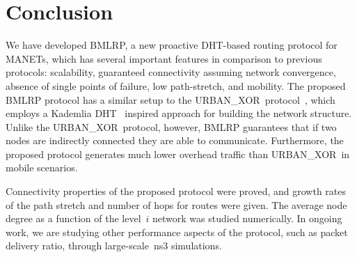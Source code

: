 \documentclass[conference]{IEEEtran}
\theoremstyle{definition}
\newcommand{\urbanxor}{URBAN\_XOR}
\begin{document}
\section{Conclusion}
\label{sec:conclusion}

We have developed BMLRP, a new proactive DHT-based routing protocol for MANETs, which has several important features in comparison to previous protocols: scalability, guaranteed connectivity assuming network convergence,  absence of single points of failure, low path-stretch, and mobility. The proposed BMLRP protocol has a similar setup to the \urbanxor\ protocol~\cite{Pasquini}, which employs a Kademlia DHT~\cite{kademlia} inspired approach for building the network structure. Unlike the \urbanxor\ protocol, however, BMLRP guarantees that if two nodes are indirectly connected they are able to communicate. Furthermore, the proposed protocol generates much lower overhead traffic than \urbanxor\ in mobile scenarios.  

Connectivity properties of the proposed protocol were proved, and growth rates of the path stretch and number of hops for routes were given. The average node degree as a function of the level~$i$ network was studied numerically. In ongoing work, we are studying other performance aspects of the protocol, such as packet delivery ratio, through large-scale~ns3 simulations.




\end{document}
